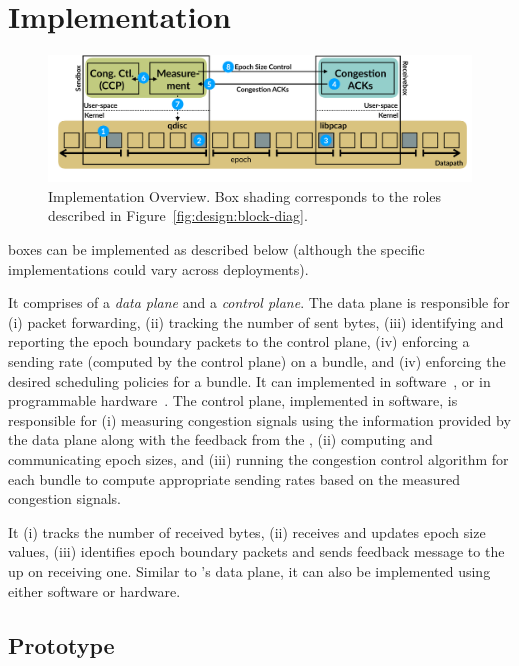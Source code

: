 \section{Implementation}\label{s:impl}
\begin{figure}[t]
    \centering
    \includegraphics[width=2\columnwidth]{img/bundler-diagram}
    \vspace{-10pt}
    \caption{\name Implementation Overview. Box shading corresponds to the roles described in Figure~\ref{fig:design:block-diag}.}\label{fig:bundler}
\end{figure}
\name boxes can be implemented as described below (although the specific implementations could vary across deployments).

\Para{\capinbox} It comprises of a \emph{data plane} and a \emph{control plane}. The data plane is responsible for (i) packet forwarding, (ii) tracking the number of sent bytes, (iii) identifying and reporting the epoch boundary packets to the control plane, (iv) enforcing a sending rate (computed by the control plane) on a bundle, and (iv) enforcing the desired scheduling policies for a bundle. 
It can implemented in software~\cite{bess, click, netbricks, tc}, or in programmable hardware~\cite{p4}. 
The control plane, implemented in software, is responsible for (i) measuring congestion signals using the information provided by the data plane along with the feedback from the \outbox, (ii) computing and communicating epoch sizes, and (iii) running the congestion control algorithm for each bundle to compute appropriate sending rates based on the measured congestion signals.

\Para{\capoutbox} It (i) tracks the number of received bytes, (ii) receives and updates epoch size values, (iii) identifies epoch boundary packets and sends feedback message to the \inbox up on receiving one. Similar to \inbox's data plane, it can also be implemented using either software or hardware.

\subsection{Prototype}\label{s:impl:prototype}

